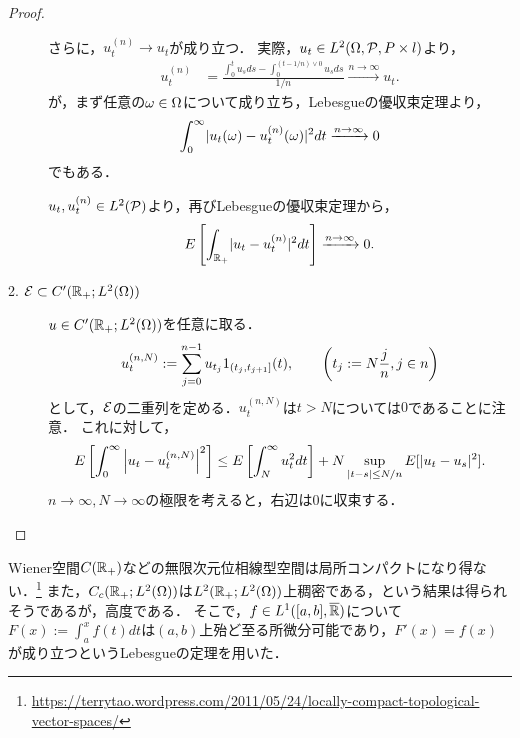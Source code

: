 \documentclass[uplatex,dvipdfmx]{jsreport}
\begin{document}
\begin{proof}
\begin{description}
        さらに，$u_t^{(n)}\to u_t$が成り立つ．
        実際，$u_t\in L^2(\Om,\P,P\times l)$より，
        \begin{align*}
            u_t^{(n)}&=\frac{\int^t_0u_sds-\int^{(t-1/n)\lor0}_0u_sds}{1/n}\xrightarrow{n\to\infty}u_t.
        \end{align*}
        が，まず任意の$\om\in\Om$について成り立ち，Lebesgueの優収束定理より，
        \[\int^\infty_0\abs{u_t(\om)-u^{(n)}_t(\om)}^2dt\xrightarrow{n\to\infty}0\]
        でもある．
        
        $u_t,u_t^{(n)}\in L^2(\P)$より，再びLebesgueの優収束定理から，
        \[E\Square{\int_{\R_+}\abs{u_t-u_t^{(n)}}^2dt}\xrightarrow{n\to\infty}0.\]
        \item[2. $\E\subset C'(\R_+;L^2(\Om))$]
        $u\in  C'(\R_+;L^2(\Om))$を任意に取る．
        \[u^{(n,N)}_t:=\sum^{n-1}_{j=0}u_{t_j}1_{(t_j,t_{j+1}]}(t),\qquad\paren{t_j:=N\frac{j}{n},j\in n}\]
        として，$\E$の二重列を定める．$u^{(n,N)}_t$は$t> N$については$0$であることに注意．
        これに対して，
        \[E\Square{\int^\infty_0\Abs{u_t-u_t^{(n,N)}}^2}\le E\Square{\int^\infty_Nu^2_tdt}+N\sup_{\abs{t-s}\le N/n}E[\abs{u_t-u_s}^2].\]
        $n\to\infty,N\to\infty$の極限を考えると，右辺は$0$に収束する．
    \end{description}
\end{proof}
\begin{remarks}
    Wiener空間$C(\R_+)$などの無限次元位相線型空間は局所コンパクトになり得ない．\footnote{\url{https://terrytao.wordpress.com/2011/05/24/locally-compact-topological-vector-spaces/}}
    また，$C_c(\R_+;L^2(\Om))$は$L^2(\R_+;L^2(\Om))$上稠密である，という結果は得られそうであるが，高度である．
    そこで，$f\in L^1([a,b],\o{\R})$について$F(x):=\int^x_af(t)dt$は$(a,b)$上殆ど至る所微分可能であり，$F'(x)=f(x)$が成り立つというLebesgueの定理を用いた．
\end{remarks}
\end{document}
